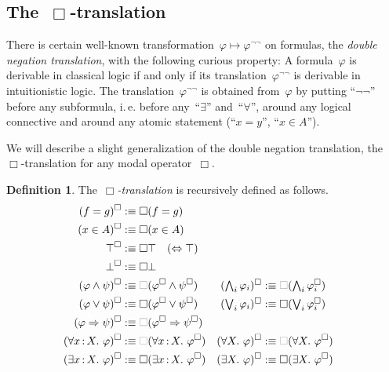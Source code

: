 \documentclass[10pt]{amsart}
\makeatletter
\theoremstyle{definition}
\newtheorem{defn}{Definition}[section]
\theoremstyle{plain}
\theoremstyle{remark}
\newcommand{\?}{\,{:}\,}
\renewcommand{\_}{\mathpunct{.}\,}
\newcommand{\ie}{i.\,e.\@\xspace}
\makeatother
\begin{document}


\subsection{The~$\Box$-translation} There is certain well-known transformation~$\varphi
\mapsto \varphi^{\neg\neg}$ on formulas, the \emph{double negation
translation}, with the following curious property: A formula~$\varphi$ is
derivable in classical logic if and only if its
translation~$\varphi^{\neg\neg}$ is derivable in intuitionistic logic. The
translation~$\varphi^{\neg\neg}$ is obtained from~$\varphi$ by putting
``$\neg\neg$'' before any subformula, \ie before any~``$\exists$''
and~``$\forall$'', around any logical connective and around any atomic
statement (``$x=y$'', ``$x \in A$'').

We will describe a slight generalization of the double negation translation,
the~$\Box$-translation for any modal operator~$\Box$.

\begin{defn}The~\emph{$\Box$-translation} is recursively defined as follows.
\newcommand{\optBox}{\textcolor{gray}{\Box}}
\begin{align*}
  (f = g)^\Box &:\equiv \Box(f = g) \\
  (x \in A)^\Box &:\equiv \Box(x \in A) \\
  \top^\Box &:\equiv \Box\top \quad \text{($\Leftrightarrow \top$)} \\
  \bot^\Box &:\equiv \Box\bot \\
  (\varphi \wedge \psi)^\Box &:\equiv \optBox(\varphi^\Box \wedge \psi^\Box) &
  \textstyle (\bigwedge_i \varphi_i)^\Box &:\equiv \textstyle \optBox(\bigwedge_i \varphi_i^\Box) \\
  (\varphi \vee \psi)^\Box &:\equiv \Box(\varphi^\Box \vee \psi^\Box) &
  \textstyle (\bigvee_i \varphi_i)^\Box &:\equiv \textstyle \Box(\bigvee_i \varphi_i^\Box) \\
  (\varphi \Rightarrow \psi)^\Box &:\equiv \optBox(\varphi^\Box \Rightarrow \psi^\Box) \\
  (\forall x\?X\_ \varphi)^\Box &:\equiv \optBox(\forall x\?X\_ \varphi^\Box) &
  (\forall X\_ \varphi)^\Box &:\equiv \optBox(\forall X\_ \varphi^\Box) \\
  (\exists x\?X\_ \varphi)^\Box &:\equiv \Box(\exists x\?X\_ \varphi^\Box) &
  (\exists X\_ \varphi)^\Box &:\equiv \Box(\exists X\_ \varphi^\Box)
\end{align*}
\end{defn}
\end{document}
